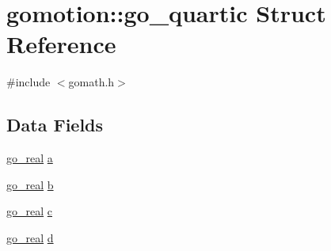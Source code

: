 \hypertarget{structgomotion_1_1go__quartic}{\section{gomotion\-:\-:go\-\_\-quartic Struct Reference}
\label{structgomotion_1_1go__quartic}
}


{\ttfamily \#include $<$gomath.\-h$>$}

\subsection*{Data Fields}
\begin{DoxyCompactItemize}
\item 
\hyperlink{gotypes_8h_afd666a2393eebd71ee455846ac9def9b}{go\-\_\-real} \hyperlink{structgomotion_1_1go__quartic_a160b6aab2661877f8027d8eaf0db0d32}{a}
\item 
\hyperlink{gotypes_8h_afd666a2393eebd71ee455846ac9def9b}{go\-\_\-real} \hyperlink{structgomotion_1_1go__quartic_a7fc463501a38f59900914bc8f93c5c84}{b}
\item 
\hyperlink{gotypes_8h_afd666a2393eebd71ee455846ac9def9b}{go\-\_\-real} \hyperlink{structgomotion_1_1go__quartic_a0b6d02bd495ab899be138928394c4d46}{c}
\item 
\hyperlink{gotypes_8h_afd666a2393eebd71ee455846ac9def9b}{go\-\_\-real} \hyperlink{structgomotion_1_1go__quartic_a27261754dea678a29b22ecc87fe2f3f5}{d}
\end{DoxyCompactItemize}


